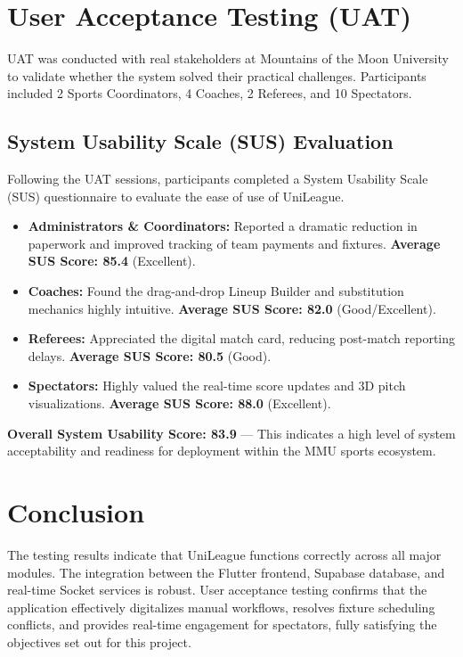 \documentclass[12pt,a4paper]{article}
\begin{document}
\section{User Acceptance Testing (UAT)}
UAT was conducted with real stakeholders at Mountains of the Moon University to validate whether the system solved their practical challenges. Participants included 2 Sports Coordinators, 4 Coaches, 2 Referees, and 10 Spectators.

\subsection{System Usability Scale (SUS) Evaluation}
Following the UAT sessions, participants completed a System Usability Scale (SUS) questionnaire to evaluate the ease of use of UniLeague. 

\begin{itemize}[label=\checkmark]
    \item \textbf{Administrators \& Coordinators:} Reported a dramatic reduction in paperwork and improved tracking of team payments and fixtures. \textbf{Average SUS Score: 85.4} (Excellent).
    \item \textbf{Coaches:} Found the drag-and-drop Lineup Builder and substitution mechanics highly intuitive. \textbf{Average SUS Score: 82.0} (Good/Excellent).
    \item \textbf{Referees:} Appreciated the digital match card, reducing post-match reporting delays. \textbf{Average SUS Score: 80.5} (Good).
    \item \textbf{Spectators:} Highly valued the real-time score updates and 3D pitch visualizations. \textbf{Average SUS Score: 88.0} (Excellent).
\end{itemize}

\textbf{Overall System Usability Score: 83.9} — This indicates a high level of system acceptability and readiness for deployment within the MMU sports ecosystem.

\section{Conclusion}
The testing results indicate that UniLeague functions correctly across all major modules. The integration between the Flutter frontend, Supabase database, and real-time Socket services is robust. User acceptance testing confirms that the application effectively digitalizes manual workflows, resolves fixture scheduling conflicts, and provides real-time engagement for spectators, fully satisfying the objectives set out for this project.
\end{document}
